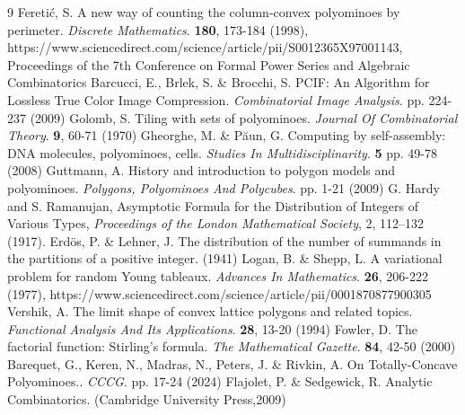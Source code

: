 \documentclass{article}
\theoremstyle{definition}
\theoremstyle{plain}
\begin{document}
\begin{thebibliography}{9}
Feretić, S. A new way of counting the column-convex polyominoes by perimeter. {\em Discrete Mathematics}. \textbf{180}, 173-184 (1998), https://www.sciencedirect.com/science/article/pii/S0012365X97001143, Proceedings of the 7th Conference on Formal Power Series and Algebraic Combinatorics
Barcucci, E., Brlek, S. \& Brocchi, S. PCIF: An Algorithm for Lossless True Color Image Compression. {\em Combinatorial Image Analysis}. pp. 224-237 (2009)
Golomb, S. Tiling with sets of polyominoes. {\em Journal Of Combinatorial Theory}. \textbf{9}, 60-71 (1970)
Gheorghe, M. \& Păun, G. Computing by self-assembly: DNA molecules, polyominoes, cells. {\em Studies In Multidisciplinarity}. \textbf{5} pp. 49-78 (2008)
Guttmann, A. History and introduction to polygon models and polyominoes. {\em Polygons, Polyominoes And Polycubes}. pp. 1-21 (2009)
G. Hardy and S. Ramanujan,
Asymptotic Formula for the Distribution of Integers of Various Types,
\textit{Proceedings of the London Mathematical Society}, 2, 112--132 (1917).
Erdös, P. \& Lehner, J. The distribution of the number of summands in the partitions of a positive integer.  (1941)
Logan, B. \& Shepp, L. A variational problem for random Young tableaux. {\em Advances In Mathematics}. \textbf{26}, 206-222 (1977), https://www.sciencedirect.com/science/article/pii/0001870877900305
Vershik, A. The limit shape of convex lattice polygons and related topics. {\em Functional Analysis And Its Applications}. \textbf{28}, 13-20 (1994)
Fowler, D. The factorial function: Stirling’s formula. {\em The Mathematical Gazette}. \textbf{84}, 42-50 (2000)
Barequet, G., Keren, N., Madras, N., Peters, J. \& Rivkin, A. On Totally-Concave Polyominoes.. {\em CCCG}. pp. 17-24 (2024)
Flajolet, P. \& Sedgewick, R. Analytic Combinatorics. (Cambridge University Press,2009)

\end{thebibliography}
\end{document}
